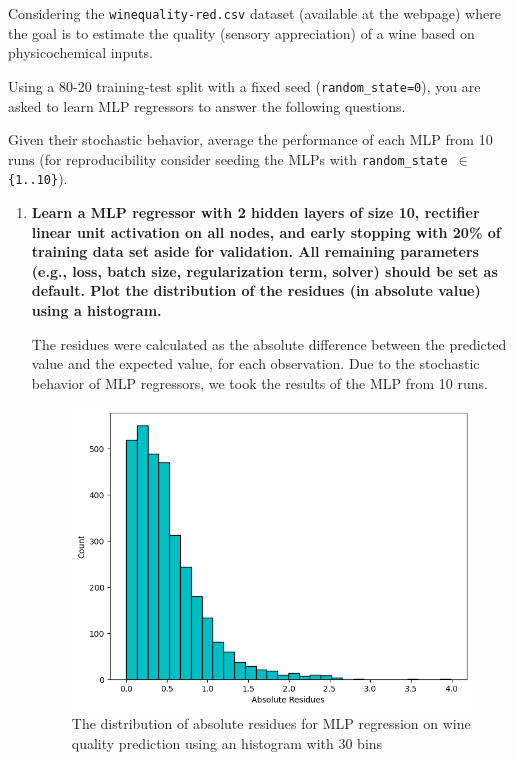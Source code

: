 \documentclass[12pt]{article}
\begin{document}
\noindent Considering the \texttt{winequality-red.csv} dataset (available at the webpage) where the goal is  to estimate the quality (sensory appreciation)
of a wine based on physicochemical inputs.

\vskip 0.2cm

\noindent Using a 80-20 training-test split with a fixed seed (\texttt{random\_state=0}), you are asked to learn MLP
regressors to answer the following questions.

\vskip 0.2cm

\noindent Given their stochastic behavior, average the performance of each MLP from 10 runs (for reproducibility consider seeding the MLPs with
\texttt{random\_state $\in$ \{1..10\}}).

\begin{enumerate}[leftmargin=\labelsep]
    \item \textbf{Learn a MLP regressor with 2 hidden layers of size 10, rectifier linear unit activation
          on all nodes, and early stopping with 20\% of training data set aside for validation. All
          remaining parameters (e.g., loss, batch size, regularization term, solver) should be set as
          default. Plot the distribution of the residues (in absolute value) using a histogram.}

          \vskip 0.3cm
          

          The residues were calculated as the absolute difference between the predicted value and the expected value, for each observation.
          Due to the stochastic behavior of MLP regressors, we took the results of the MLP from 10 runs.

          \begin{figure}[H]
              \centering
              \includegraphics[width=14cm]{./assets/residues_histogram_ex1_PartII.png}
              \caption{The distribution of absolute residues for MLP regression on wine quality prediction using an histogram with 30 bins}
              \label{fig:PartII-ex1}
          \end{figure}


\end{enumerate}
\end{document}
